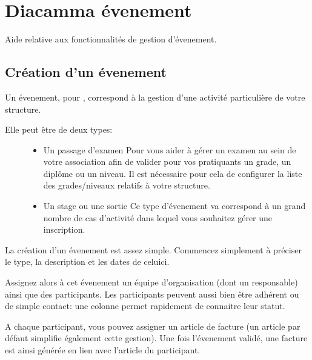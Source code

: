 \documentclass[a4paper,10pt,oneside,french]{sphinxmanual}
\begin{document}
\chapter{Diacamma évenement}
\label{\detokenize{event/index:diacamma-evenement}}\label{\detokenize{event/index::doc}}
\sphinxAtStartPar
Aide relative aux fonctionnalités de gestion d’évenement.


\section{Création d’un évenement}
\label{\detokenize{event/newevent:creation-d-un-evenement}}\label{\detokenize{event/newevent::doc}}
\sphinxAtStartPar
Un évenement, pour , correspond à la gestion d’une activité particulière de votre structure.
\begin{description}
\item[{Elle peut être de deux types:}] \leavevmode\begin{itemize}
\item {} 
\sphinxAtStartPar
Un passage d’examen
Pour vous aider à gérer un examen au sein de votre association afin de valider pour vos pratiquants un grade, un diplôme ou un niveau.
Il est nécessaire pour cela de configurer la liste des grades/niveaux relatifs à votre structure.

\item {} 
\sphinxAtStartPar
Un stage ou une sortie
Ce type d’évenement va correspond à un grand nombre de cas d’activité dans lequel vous souhaitez gérer une inscription.

\end{itemize}

\end{description}

\sphinxAtStartPar
La création d’un évenement est assez simple.
Commencez simplement à préciser le type, la description et les dates de celui\sphinxhyphen{}ci.

\sphinxAtStartPar
Assignez alors à cet évenement un équipe d’organisation (dont un responsable) ainsi que des participants.
Les participants peuvent aussi bien être adhérent ou de simple contact: une colonne permet rapidement de connaitre leur statut.

\sphinxAtStartPar
A chaque participant, vous pouvez assigner un article de facture (un article par défaut simplifie également cette gestion).
Une fois l’évenement validé, une facture est ainsi générée en lien avec l’article du participant.
\end{document}
